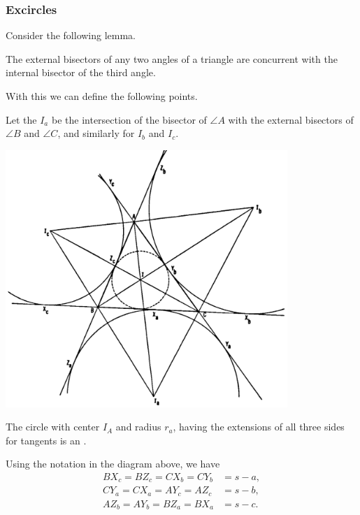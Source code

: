 \documentclass[DIV=12, a4]{scrartcl}
\begin{document}
\subsubsection{Excircles}

Consider the following lemma.
\begin{lemma}
	The external bisectors of any two angles of a triangle are concurrent with the internal bisector of the third angle.
\end{lemma}

With this we can define the following points.

\begin{definition}
	Let the  $I_a$ be the intersection of the bisector of $\angle A$ with the external bisectors of $\angle B$ and $\angle C$, and similarly for $I_b$ and $I_c$.
\end{definition}

\begin{center}
		\includegraphics[width=0.8\textwidth]{media/1-4B}
\end{center}

\begin{definition}
	The circle with center $I_A$ and radius $r_a$, having the extensions of all three sides for tangents is an .
\end{definition}

\begin{theorem}
Using the notation in the diagram above, we have
	\begin{align*}
		B X_{c}=B Z_{c}=C X_{b}=C Y_{b}&=s-a, \\
C Y_{a}=C X_{a}=A Y_{c}=A Z_{c}&=s-b, \\
A Z_{b}=A Y_{b}=B Z_{a}=B X_{a}&=s-c.
	\end{align*}
\end{theorem}
\end{document}

